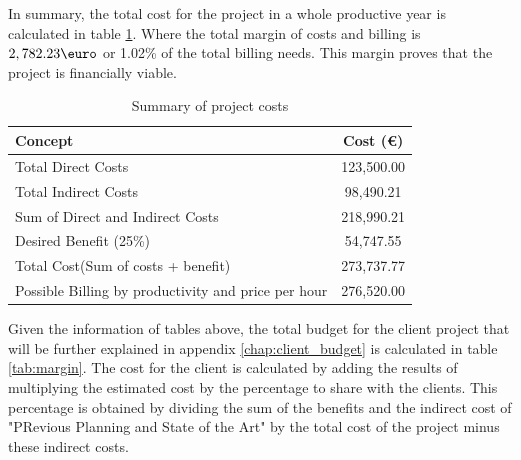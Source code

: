 In summary, the total cost for the project in a whole productive year is calculated in table \ref{tab:summary}. 
Where the \textbf{}{total margin of costs and billing} is $2,782.23\text{\euro}$ or 1.02\% of the total billing needs.
This margin proves that the project is financially viable.
\begin{table} [H]
    \centering
    \begin{tabular}{|l|c|}
        \hline
        \textbf{Concept} & \textbf{Cost (\euro)} \\ \hline
        Total Direct Costs & 123,500.00 \\ \hline
        Total Indirect Costs & 98,490.21 \\ \hline
        Sum of Direct and Indirect Costs & 218,990.21 \\ \hline
        Desired Benefit (25\%) & 54,747.55 \\ \hline
        Total Cost(Sum of costs + benefit) & 273,737.77 \\ \hline
        Possible Billing by productivity and price per hour & 276,520.00 \\ \hline
    \end{tabular}
    \caption{Summary of project costs}
    \label{tab:summary}

\end{table}
Given the information of tables above, the total budget for the client project that will be further explained in appendix 
\ref{chap:client_budget} is calculated in table \ref{tab:margin}. The cost for the client is calculated by adding the results of
multiplying the estimated cost by the percentage to share with the clients. This percentage is obtained 
by dividing the sum of the benefits and the indirect cost of "PRevious Planning and State of the Art" by
the total cost of the project minus these indirect costs.
